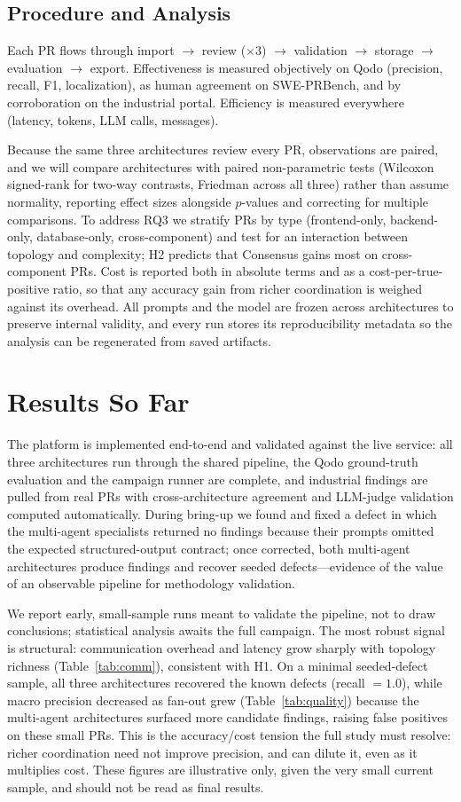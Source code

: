 \documentclass[conference]{IEEEtran}
\begin{document}
\subsection{Procedure and Analysis}
Each PR flows through import $\rightarrow$ review ($\times 3$) $\rightarrow$
validation $\rightarrow$ storage $\rightarrow$ evaluation $\rightarrow$ export.
Effectiveness is measured objectively on Qodo (precision, recall, F1,
localization), as human agreement on SWE-PRBench, and by corroboration on the
industrial portal. Efficiency is measured everywhere (latency, tokens, LLM calls,
messages).

Because the same three architectures review every PR, observations are paired,
and we will compare architectures with paired non-parametric tests (Wilcoxon
signed-rank for two-way contrasts, Friedman across all three) rather than assume
normality, reporting effect sizes alongside $p$-values and correcting for multiple
comparisons. To address RQ3 we stratify PRs by type (frontend-only, backend-only,
database-only, cross-component) and test for an interaction between topology and
complexity; H2 predicts that Consensus gains most on cross-component PRs. Cost is
reported both in absolute terms and as a cost-per-true-positive ratio, so that any
accuracy gain from richer coordination is weighed against its overhead. All
prompts and the model are frozen across architectures to preserve internal
validity, and every run stores its reproducibility metadata so the analysis can be
regenerated from saved artifacts.

\section{Results So Far}
The platform is implemented end-to-end and validated against the live service:
all three architectures run through the shared pipeline, the Qodo ground-truth
evaluation and the campaign runner are complete, and industrial findings are pulled
from real PRs with cross-architecture agreement and LLM-judge validation computed
automatically. During bring-up we found and fixed a defect in which the multi-agent
specialists returned no findings because their prompts omitted the expected
structured-output contract; once corrected, both multi-agent architectures produce
findings and recover seeded defects---evidence of the value of an observable
pipeline for methodology validation.

We report early, small-sample runs meant to validate the pipeline, not to draw
conclusions; statistical analysis awaits the full campaign. The most robust signal
is structural: communication overhead and latency grow sharply with topology
richness (Table~\ref{tab:comm}), consistent with H1. On a minimal seeded-defect
sample, all three architectures recovered the known defects (recall $=1.0$), while
macro precision decreased as fan-out grew (Table~\ref{tab:quality}) because the
multi-agent architectures surfaced more candidate findings, raising false
positives on these small PRs. This is the accuracy/cost tension the full study
must resolve: richer coordination need not improve precision, and can dilute it,
even as it multiplies cost. These figures are illustrative only, given the very
small current sample, and should not be read as final results.
\end{document}
